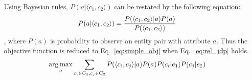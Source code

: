 Using Bayesian rules, $P(a| \langle c_{1},c_{2} \rangle )$ can be restated by the following equation:
\begin{equation}
\label{eq:target_expand1}
\small
P(a|\langle c_{1},c_{2} \rangle)= \frac{ P(\langle c_{1},c_{2}\rangle|a)P(a) }{ P(\langle c_{1},c_{2}\rangle) }
\end{equation},
where $P(a)$ is probability to observe an entity pair with attribute $a$.
Thus the objective function is reduced to Eq.~\ref{eq:simple_obj} when Eq.~\ref{eq:rel_jdp} holds.
\begin{equation}
\label{eq:simple_obj}
\small
 \argmax_a \sum_{c_i\in C_1, c_j\in C_2} P(\langle c_{i},c_{j}\rangle |a) P(a) P(c_i|e_1) P(c_j|e_2)
\end{equation}




%

\vspace{-2mm}
